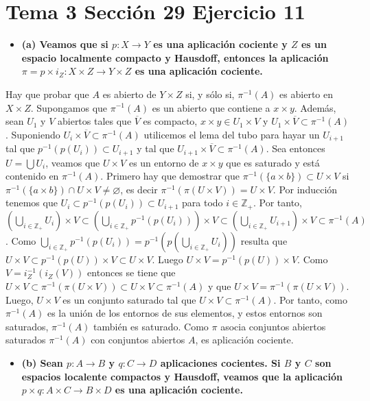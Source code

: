\documentclass{article}
\begin{document}
\section{Tema 3 Sección 29 Ejercicio 11}
\begin{itemize}
\item \bf (a) \rm Veamos que si $p:X\rightarrow Y$ es una aplicación cociente y $Z$ es un espacio localmente compacto y Hausdoff, entonces la aplicación $\pi= p\times i_Z: X\times Z\rightarrow Y\times Z$ es una aplicación cociente.
\end{itemize}
Hay que probar que $A$ es abierto de $Y\times Z$ si, y sólo si, $\pi^{-1}(A)$ es abierto en $X\times Z$. Supongamos que $\pi^{-1}(A)$ es un abierto que contiene a $x\times y$. Además, sean $U_1$ y $V$ abiertos tales que $\overline{V}$ es compacto, $x\times y\in U_1\times V$ y $U_1\times \overline{V}\subset \pi^{-1}(A)$. Suponiendo $U_i\times \overline{V}\subset \pi^{-1}(A)$ utilicemos el lema del tubo para hayar un $U_{i+1}$ tal que $p^{-1}(p(U_i))\subset U_{i+1}$ y tal que $U_{i+1}\times \overline{V}\subset \pi^{-1}(A)$. Sea entonces $U=\bigcup  U_i$, veamos que $U\times V$ es un entorno de $x\times y$ que es saturado y está contenido en $\pi^{-1}(A)$. Primero hay que demostrar que $\pi^{-1}(\{a\times b\})\subset U\times V$ si $\pi^{-1}(\{a\times b\})\cap U\times V \neq \varnothing$, es decir $\pi^{-1}(\pi(U\times V))=U\times V$. Por inducción tenemos que $U_i\subset p^{-1}(p(U_i))\subset U_{i+1}$ para todo $i\in \mathbb{Z}_+$. Por tanto, $\left(\bigcup_{i\in \mathbb{Z}_+}U_i\right)\times V\subset \left(\bigcup_{i\in \mathbb{Z}_+}p^{-1}(p(U_i ))\right)\times V\subset \left(\bigcup_{i\in \mathbb{Z}_+}U_{i+1}\right)\times V\subset \pi^{-1}(A)$. Como $\bigcup_{i\in \mathbb{Z}_+}p^{-1}(p(U_i ))=p^{-1}(p(\bigcup_{i\in \mathbb{Z}_+}U_i ))$ resulta que $U\times V\subset p^{-1}(p(U ))\times V\subset U\times V$. Luego $U\times V =p^{-1}(p(U ))\times V$. Como $V=i^{-1}_Z (i_Z(V))$ entonces se tiene que $U\times V \subset \pi^{-1}(\pi(U\times V))\subset U\times V\subset \pi^{-1}(A)$ y que $U\times V =\pi^{-1}(\pi(U\times V))$. Luego, $U\times V$ es un conjunto saturado tal que $U\times V \subset \pi^{-1}(A)$. Por tanto, como $\pi^{-1}(A)$ es la unión de los entornos de sus elementos, y estos entornos son saturados, $\pi^{-1}(A)$ también es saturado. Como $\pi$ asocia conjuntos abiertos saturados $\pi^{-1}(A)$ con conjuntos abiertos $A$, es aplicación cociente.
\begin{itemize}
\item \bf (b) \rm Sean $p:A\rightarrow B$ y $q:C\rightarrow D$ aplicaciones cocientes. Si $B$ y $C$  son espacios localente compactos y Hausdoff, veamos que la aplicación $p\times q: A\times C\rightarrow B\times D$ es una aplicación cociente.
\end{itemize}
\end{document}
